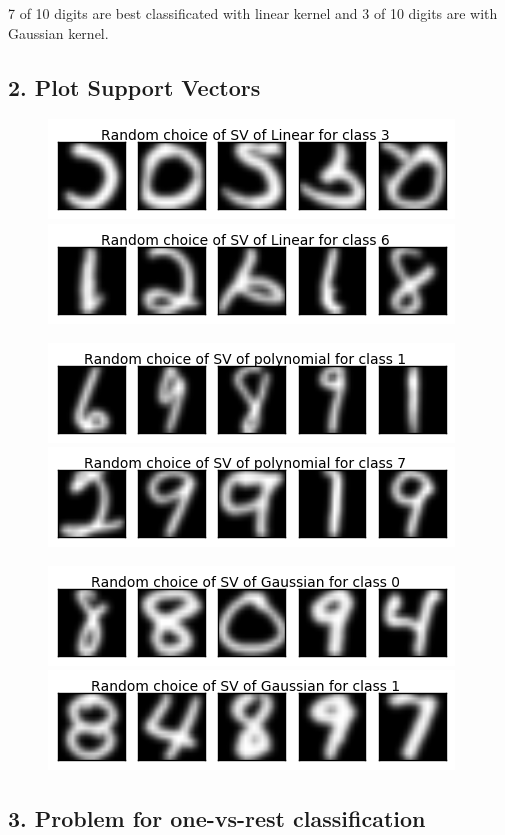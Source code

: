 \documentclass[a4paper,11pt]{article}
\begin{document}
7 of 10 digits are best classificated with linear kernel and 3 of 10 digits are with Gaussian kernel. 


\subsection*{2. Plot Support Vectors}

\begin{figure}[htbp]
  \includegraphics[scale=0.7]{svlc3.png}
  \includegraphics[scale=0.7]{svlc6.png}
\end{figure}

\begin{figure}[htbp]
  \includegraphics[scale=0.7]{svpc1.png}
  \includegraphics[scale=0.7]{svpc7.png}
\end{figure}

\begin{figure}[htbp]
  \includegraphics[scale=0.7]{svgc0.png}
  \includegraphics[scale=0.7]{svgc1.png}
\end{figure}


\subsection*{3. Problem for one-vs-rest classification}
\end{document}
